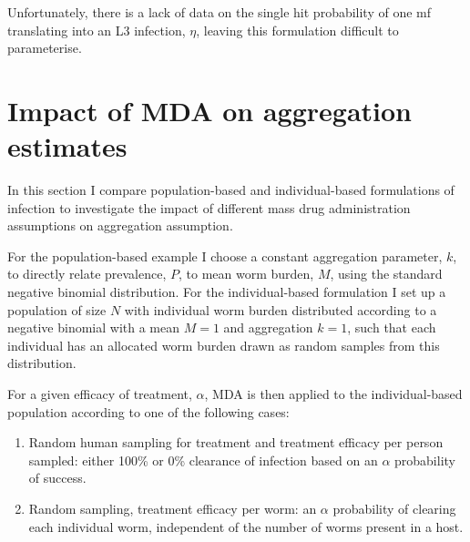 Unfortunately, there is a lack of data on the single hit probability of one mf translating into an L3 infection, $\eta$, leaving this formulation difficult to parameterise.

\section[MDA]{Impact of MDA on aggregation estimates}

In this section I compare population-based and individual-based formulations of infection to investigate the impact of different mass drug administration assumptions on aggregation assumption. 

For the population-based example I choose a constant aggregation parameter, $k$, to directly relate prevalence, $P$, to mean worm burden, $M$, using the standard negative binomial distribution. For the individual-based formulation I set up a population of size $N$ with individual worm burden distributed according to a negative binomial with a mean $M=1$ and aggregation $k=1$, such that each individual has an allocated worm burden drawn as random samples from this distribution.

For a given efficacy of treatment, $\alpha$, MDA is then applied to the individual-based population according to one of the following cases:
\begin{enumerate}
    \item Random human sampling for treatment and treatment efficacy per person sampled: either 100\% or 0\% clearance of infection based on an $\alpha$ probability of success.
    \item Random sampling, treatment efficacy per worm: an $\alpha$ probability of clearing each individual worm, independent of the number of worms present in a host.
\end{enumerate}

